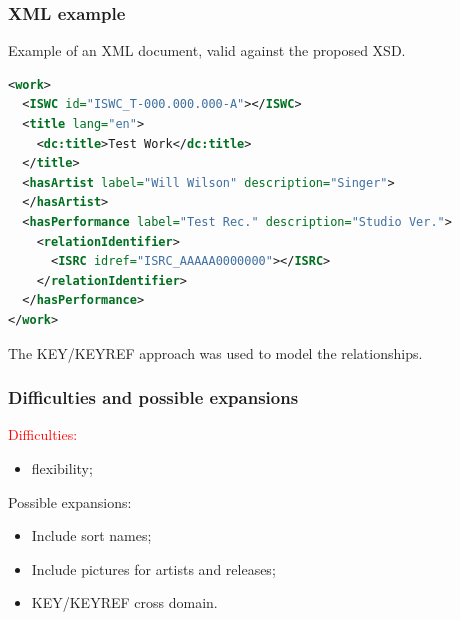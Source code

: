 \documentclass{beamer}
\begin{document}
  \begin{frame}[fragile]
    \frametitle{XML example}

    Example of an XML document, valid against the proposed XSD.

    \vspace{0.5em}

    \lstset{basicstyle=\scriptsize\ttfamily}
\begin{lstlisting}[language=XML]
<work>
  <ISWC id="ISWC_T-000.000.000-A"></ISWC>
  <title lang="en">
    <dc:title>Test Work</dc:title>
  </title>
  <hasArtist label="Will Wilson" description="Singer">
  </hasArtist>
  <hasPerformance label="Test Rec." description="Studio Ver.">
    <relationIdentifier>
      <ISRC idref="ISRC_AAAAA0000000"></ISRC>
    </relationIdentifier>
  </hasPerformance>
</work>
\end{lstlisting}

    \vspace{1em}

    The KEY/KEYREF approach was used to model the relationships.
  \end{frame}



  \begin{frame}
    \frametitle{Difficulties and possible expansions}
    
    \textcolor{red}{Difficulties:}
    
    \vspace{0.5em}
    
    \begin{itemize}
      \item flexibility;
      
    \end{itemize}

    \vspace{1em}
    
    Possible expansions:
    
    \vspace{0.5em}
    
    \begin{itemize}
      \item Include sort names;
      \item Include pictures for artists and releases;
      \item KEY/KEYREF cross domain.
    \end{itemize}

  \end{frame}
\end{document}
